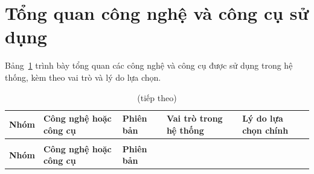 \section{Tổng quan công nghệ và công cụ sử dụng}
\label{sec:tong-quan-cong-nghe}

Bảng~\ref{tab:tong-quan-cong-nghe} trình bày tổng quan các công nghệ và công cụ được sử dụng trong
hệ thống, kèm theo vai trò và lý do lựa chọn.

\begin{longtable}[]{@{}
  >{\raggedright\arraybackslash}p{0.18\dimexpr\linewidth-8\tabcolsep\relax}
  >{\raggedright\arraybackslash}p{0.19\dimexpr\linewidth-8\tabcolsep\relax}
  >{\raggedright\arraybackslash}p{0.10\dimexpr\linewidth-8\tabcolsep\relax}
  >{\raggedright\arraybackslash}p{0.26\dimexpr\linewidth-8\tabcolsep\relax}
  >{\raggedright\arraybackslash}p{0.27\dimexpr\linewidth-8\tabcolsep\relax}@{}}
\caption{Tổng quan công nghệ và công cụ sử dụng}\label{tab:tong-quan-cong-nghe}\\
\toprule\noalign{}
\begin{minipage}[b]{\linewidth}\raggedright
\textbf{Nhóm}
\end{minipage} & \begin{minipage}[b]{\linewidth}\raggedright
\textbf{Công nghệ hoặc công cụ}
\end{minipage} & \begin{minipage}[b]{\linewidth}\raggedright
\textbf{Phiên bản}
\end{minipage} & \begin{minipage}[b]{\linewidth}\raggedright
\textbf{Vai trò trong hệ thống}
\end{minipage} & \begin{minipage}[b]{\linewidth}\raggedright
\textbf{Lý do lựa chọn chính}
\end{minipage} \\
\midrule\noalign{}
\endfirsthead
\caption[]{(tiếp theo)}\\
\toprule\noalign{}
\begin{minipage}[b]{\linewidth}\raggedright
\textbf{Nhóm}
\end{minipage} & \begin{minipage}[b]{\linewidth}\raggedright
\textbf{Công nghệ hoặc công cụ}
\end{minipage} & \begin{minipage}[b]{\linewidth}\raggedright
\textbf{Phiên bản}
\end{minipage} & \begin{minipage}[b]{\linewidth}\raggedright

\end{minipage}
\end{longtable}
